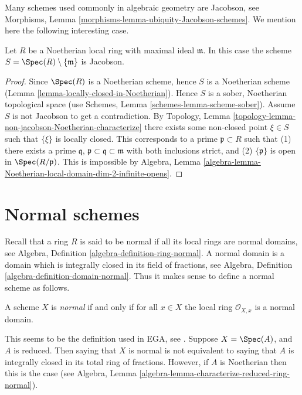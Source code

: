 \noindent
Many schemes used commonly in algebraic geometry are Jacobson, see
Morphisms, Lemma \ref{morphisms-lemma-ubiquity-Jacobson-schemes}.
We mention here the following interesting case.

\begin{lemma}
\label{lemma-complement-closed-point-Jacobson}
Let $R$ be a Noetherian local ring with maximal ideal $\mathfrak m$.
In this case the scheme $S = \Spec(R) \setminus \{\mathfrak m\}$
is Jacobson.
\end{lemma}

\begin{proof}
Since $\Spec(R)$ is a Noetherian scheme, hence
$S$ is a Noetherian scheme (Lemma \ref{lemma-locally-closed-in-Noetherian}).
Hence $S$ is a sober, Noetherian topological space (use
Schemes, Lemma \ref{schemes-lemma-scheme-sober}).
Assume $S$ is not Jacobson to
get a contradiction. By
Topology, Lemma \ref{topology-lemma-non-jacobson-Noetherian-characterize}
there exists some non-closed point $\xi \in S$
such that $\{\xi\}$ is locally closed. This corresponds
to a prime $\mathfrak p \subset R$ such that (1) there exists
a prime $\mathfrak q$, $\mathfrak p \subset \mathfrak q \subset \mathfrak m$
with both inclusions strict, and (2) $\{\mathfrak p\}$ is open in
$\Spec(R/\mathfrak p)$. This is impossible by Algebra,
Lemma \ref{algebra-lemma-Noetherian-local-domain-dim-2-infinite-opens}.
\end{proof}







\section{Normal schemes}
\label{section-normal}

\noindent
Recall that a ring $R$ is said to be normal if all its local rings
are normal domains,
see Algebra, Definition \ref{algebra-definition-ring-normal}.
A normal domain is a domain which is integrally closed in its field
of fractions, see
Algebra, Definition \ref{algebra-definition-domain-normal}.
Thus it makes sense to define a normal scheme as follows.

\begin{definition}
\label{definition-normal}
A scheme $X$ is {\it normal} if and only if for all $x \in X$ the local ring
$\mathcal{O}_{X, x}$ is a normal domain.
\end{definition}

\noindent
This seems to be the definition used in EGA, see \cite[0, 4.1.4]{EGA}.
Suppose $X = \Spec(A)$, and $A$ is reduced. Then saying that $X$ is
normal is not equivalent to saying that $A$ is integrally closed in its
total ring of fractions. However, if $A$ is Noetherian then this is the case
(see Algebra, Lemma \ref{algebra-lemma-characterize-reduced-ring-normal}).

